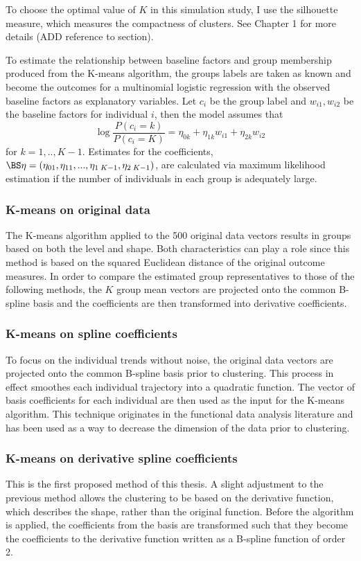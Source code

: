 To choose the optimal value of $K$ in this simulation study, I use the silhouette measure, which measures the compactness of clusters. See Chapter 1 for more details (ADD reference to section). 

To estimate the relationship between baseline factors and group membership produced from the K-means algorithm, the groups labels are taken as known and become the outcomes for a multinomial logistic regression with the observed baseline factors as explanatory variables. Let $c_{i}$ be the group label and $w_{i1}, w_{i2}$ be the baseline factors for individual $i$, then the model assumes that
$$\log\frac{P(c_{i}=k)}{P(c_{i}=K)} = \eta_{0k}+\eta_{1k}w_{i1}+\eta_{2k}w_{i2}$$
for $k=1,..,K-1$. Estimates for the coefficients, $\BS\eta = (\eta_{01},\eta_{11},...,\eta_{1\;K-1},\eta_{2\;K-1})$, are calculated via maximum likelihood estimation if the number of individuals in each group is adequately large.

\subsubsection{K-means on original data}
The K-means algorithm applied to the 500 original data vectors results in groups based on both the level and shape. Both characteristics can play a role since this method is based on the squared Euclidean distance of the original outcome measures. In order to compare the estimated group representatives to those of the following methods, the $K$ group mean vectors are projected onto the common B-spline basis and the coefficients are then transformed into derivative coefficients.  

\subsubsection{K-means on spline coefficients}
To focus on the individual trends without noise, the original data vectors are projected onto the common B-spline basis prior to clustering. This process in effect smoothes each individual trajectory into a quadratic function. The vector of basis coefficients for each individual are then used as the input for the K-means algorithm. This technique originates in the functional data analysis literature \cite{ramsay2005} and has been used as a way to decrease the dimension of the data prior to clustering. 

\subsubsection{K-means on derivative spline coefficients}
This is the first proposed method of this thesis. A slight adjustment to the previous method allows the clustering to be based on the derivative function, which describes the shape, rather than the original function. Before the algorithm is applied, the coefficients from the basis are transformed such that they become the coefficients to the derivative function written as a B-spline function of order 2. 

